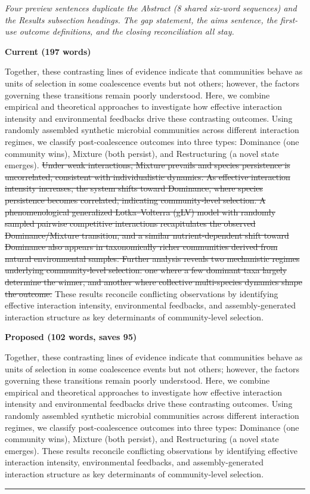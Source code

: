 \documentclass[11pt,a4paper]{article}
\newcommand{\cutx}[1]{{\color{CutRed}\sout{#1}}}
\newcommand{\rationale}[1]{{\color{GrayNote}\small\textit{#1}}\par\smallskip}
\newcommand{\panel}[1]{\par\smallskip\noindent\textbf{\small #1}\par}
\newcommand{\decision}{\par\smallskip\noindent{\color{GrayNote}\small$\square$~accept\quad$\square$~reject\quad$\square$~modify}\par
\noindent\rule{\linewidth}{0.4pt}}
\begin{document}
\rationale{Four preview sentences duplicate the Abstract (8 shared six-word sequences) and the Results subsection headings. The gap statement, the aims sentence, the first-use outcome definitions, and the closing reconciliation all stay.}
\panel{Current (197 words)}
Together, these contrasting lines of evidence indicate that communities behave as units of selection in some coalescence events but not others; however, the factors governing these transitions remain poorly understood. Here, we combine empirical and theoretical approaches to investigate how effective interaction intensity and environmental feedbacks drive these contrasting outcomes. Using randomly assembled synthetic microbial communities across different interaction regimes, we classify post-coalescence outcomes into three types: Dominance (one community wins), Mixture (both persist), and Restructuring (a novel state emerges). \cutx{Under weak interactions, Mixture prevails and species persistence is uncorrelated, consistent with individualistic dynamics. As effective interaction intensity increases, the system shifts toward Dominance, where species persistence becomes correlated, indicating community-level selection. A phenomenological generalized Lotka--Volterra (gLV) model with randomly sampled pairwise competitive interactions recapitulates the observed Dominance/Mixture transition, and a similar nutrient-dependent shift toward Dominance also appears in taxonomically richer communities derived from natural environmental samples. Further analysis reveals two mechanistic regimes underlying community-level selection: one where a few dominant taxa largely determine the winner, and another where collective multi-species dynamics shape the outcome. }These results reconcile conflicting observations by identifying effective interaction intensity, environmental feedbacks, and assembly-generated interaction structure as key determinants of community-level selection.
\panel{Proposed (102 words, saves 95)}
Together, these contrasting lines of evidence indicate that communities behave as units of selection in some coalescence events but not others; however, the factors governing these transitions remain poorly understood. Here, we combine empirical and theoretical approaches to investigate how effective interaction intensity and environmental feedbacks drive these contrasting outcomes. Using randomly assembled synthetic microbial communities across different interaction regimes, we classify post-coalescence outcomes into three types: Dominance (one community wins), Mixture (both persist), and Restructuring (a novel state emerges). These results reconcile conflicting observations by identifying effective interaction intensity, environmental feedbacks, and assembly-generated interaction structure as key determinants of community-level selection.
\decision
\end{document}
